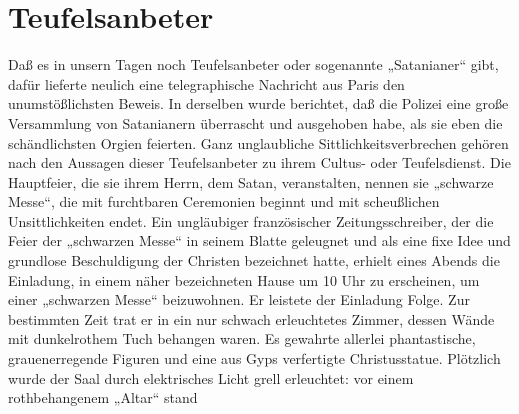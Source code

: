 \chapter[Teufelsanbeter]{Teufelsanbeter}
Daß es in unsern Tagen noch Teufelsanbeter oder sogenannte „Satanianer“ gibt, dafür lieferte neulich eine telegraphische Nachricht aus Paris den unumstößlichsten Beweis. In derselben wurde berichtet, daß die Polizei eine große Versammlung von Satanianern überrascht und ausgehoben habe, als sie eben die schändlichsten Orgien feierten. Ganz unglaubliche Sittlichkeitsverbrechen gehören nach den Aussagen dieser Teufelsanbeter zu ihrem Cultus- oder Teufelsdienst. Die Hauptfeier, die sie ihrem Herrn, dem Satan, veranstalten, nennen sie „schwarze Messe“, die mit furchtbaren Ceremonien beginnt und mit scheußlichen Unsittlichkeiten endet. Ein ungläubiger französischer Zeitungsschreiber, der die Feier der „schwarzen Messe“ in seinem Blatte geleugnet und als eine fixe Idee und grundlose Beschuldigung der Christen bezeichnet hatte, erhielt eines Abends die Einladung, in einem näher bezeichneten Hause um 10 Uhr zu erscheinen, um einer „schwarzen Messe“ beizuwohnen. Er leistete der Einladung Folge. Zur bestimmten Zeit trat er in ein nur schwach erleuchtetes Zimmer, dessen Wände mit dunkelrothem Tuch behangen waren. Es gewahrte allerlei phantastische, grauenerregende Figuren und eine aus Gyps verfertigte Christusstatue. Plötzlich wurde der Saal durch elektrisches Licht grell erleuchtet: vor einem rothbehangenem „Altar“ stand

